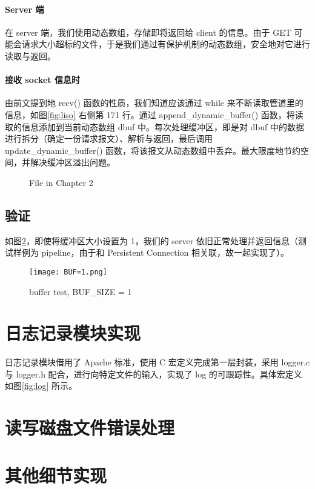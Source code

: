 \paragraph*{Server 端} 在 server 端，我们使用动态数组，存储即将返回给 client 的信息。由于 GET 可能会请求大小超标的文件，于是我们通过有保护机制的动态数组，安全地对它进行读取与返回。

\paragraph*{接收 socket 信息时} 由前文提到地 recv() 函数的性质，我们知道应该通过 while 来不断读取管道里的信息，如图\ref{fig:liso} 右侧第 171 行。通过 append\_dynamic\_buffer() 函数，将读取的信息添加到当前动态数组 dbuf 中。每次处理缓冲区，即是对 dbuf 中的数据进行拆分（确定一份请求报文）、解析与返回，最后调用 update\_dynamic\_buffer() 函数，将该报文从动态数组中丢弃。最大限度地节约空间，并解决缓冲区溢出问题。
\begin{figure}[htbp!]
    \centering
    \caption{File in Chapter 2}\label{fig:Chapter2}
\end{figure}


\subsection{验证}
如图\ref{fig:buffer}，即使将缓冲区大小设置为 1，我们的 server 依旧正常处理并返回信息（测试样例为 pipeline，由于和 Persistent Connection 相关联，故一起实现了）。

\begin{figure}[htbp!]
    \centering
    \texttt{[image: BUF=1.png]}
    \caption{buffer test, BUF\_SIZE = 1}\label{fig:buffer}
\end{figure}

\section{日志记录模块实现}
日志记录模块借用了 Apache 标准，使用 C 宏定义完成第一层封装，采用 logger.c 与 logger.h 配合，进行向特定文件的输入，实现了 log 的可跟踪性。具体宏定义如图\ref{fig:log} 所示。



\section{读写磁盘文件错误处理}

\section{其他细节实现}



